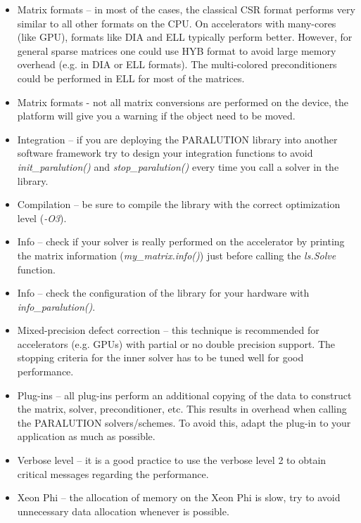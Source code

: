 \begin{itemize}
\item Matrix formats -- in most of the cases, the classical CSR format performs very similar to all other formats on the CPU. On accelerators with many-cores (like GPU), formats like DIA and ELL typically perform better. However, for general sparse matrices one could use HYB format to avoid large memory overhead (e.g. in DIA or ELL formats). The multi-colored preconditioners could be performed in ELL for most of the matrices.

\item Matrix formats - not all matrix conversions are performed on the device, the platform will give you a warning if the object need to be moved.

\item Integration -- if you are deploying the PARALUTION library into another software framework try to design your integration functions to avoid \emph{init\_paralution()} and \emph{stop\_paralution()} every time you call a solver in the library. 

\item Compilation -- be sure to compile the library with the correct optimization level (\emph{-O3}).

\item Info -- check if your solver is really performed on the accelerator by printing the matrix information (\emph{my\_matrix.info()}) just before calling the \emph{ls.Solve} function.

\item Info -- check the configuration of the library for your hardware with \emph{info\_paralution()}.

\item Mixed-precision defect correction -- this technique is recommended for accelerators (e.g. GPUs) with partial or no double precision support. The stopping criteria for the inner solver has to be tuned well for good performance. 

\item Plug-ins -- all plug-ins perform an additional copying of the data to construct the matrix, solver, preconditioner, etc. This results in overhead when calling the PARALUTION solvers/schemes. To avoid this, adapt the plug-in to your application as much as possible.

\item Verbose level -- it is a good practice to use the verbose level 2 to obtain critical messages regarding the performance.

\item Xeon Phi -- the allocation of memory on the Xeon Phi is slow, try to avoid unnecessary data allocation whenever is possible.

\end{itemize}

